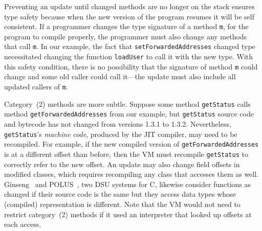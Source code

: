 Preventing an update until changed methods are no longer
on the stack  
ensures type safety because when the new version of the program resumes it
will be self consistent.  If a 
programmer changes the type signature of a method {\tt m}, for the program to
compile properly, the programmer must also change any methods that
call {\tt m}.  
In our example, the fact that {\tt setForwardedAddresses}
changed type necessitated changing the function {\tt loadUser} to
call it with the new type.  With this safety condition, there is no
possibility that the signature of method
{\tt m} could change and some old caller could call it---the update must also
include all updated callers of {\tt m}.

Category~(2) methods are more subtle.  Suppose some method \texttt{getStatus}
calls method \texttt{getForwardedAddresses} from our example, but
\texttt{getStatus} 
source code and bytecode has not changed from versions 1.3.1 to 1.3.2.
Nevertheless, \texttt{getStatus}'s \emph{machine code}, produced by the
JIT compiler, may need to be recompiled.  For example, if the new
compiled version of {\tt getForwarded\-Addresses} is at a different offset 
than before, then the VM must recompile
\texttt{getStatus} to correctly refer to the new
offset.  An update may also change field offsets in modified classes,
which requires recompiling any class that accesses
them as well.  
Ginseng~\cite{neamtiu06dsu} and POLUS~\cite{chen:icse07}, two
DSU systems for C, likewise consider functions as changed if their
source code is the same but they
access data types whose (compiled) representation is different.
Note that the VM would not need to restrict category~(2) methods if it used an
interpreter that looked up offsets at each access.




